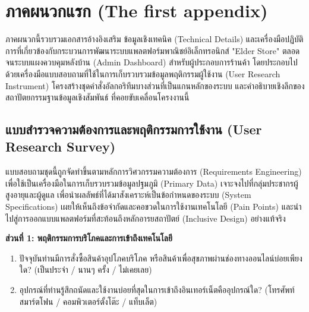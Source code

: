 \chapter{ภาคผนวกแรก (The first appendix)}

ภาคผนวกนี้รวบรวมเอกสารอ้างอิงเสริม ข้อมูลเชิงเทคนิค (Technical Details) และเครื่องมือปฏิบัติการที่เกี่ยวข้องกับกระบวนการพัฒนาระบบแพลตฟอร์มพาณิชย์อิเล็กทรอนิกส์ "Elder Store" ตลอดจนระบบแผงควบคุมหลังบ้าน (Admin Dashboard) สำหรับผู้ประกอบการร้านค้า โดยประกอบไปด้วยเครื่องมือแบบสอบถามที่ใช้ในการเก็บรวบรวมข้อมูลพฤติกรรมผู้ใช้งาน (User Research Instrument) โครงสร้างชุดคำสั่งอัลกอริทึมบางส่วนที่เป็นแกนหลักของระบบ และคำอธิบายเชิงลึกของสถาปัตยกรรมฐานข้อมูลเชิงสัมพันธ์ \cite{postgresql2023} ที่คอยขับเคลื่อนโครงงานนี้

\section{แบบสำรวจความต้องการและพฤติกรรมการใช้งาน (User Research Survey)}
แบบสอบถามชุดนี้ถูกจัดทำขึ้นตามหลักการวิศวกรรมความต้องการ (Requirements Engineering) \cite{pressman2014} เพื่อใช้เป็นเครื่องมือในการเก็บรวบรวมข้อมูลปฐมภูมิ (Primary Data) เจาะจงไปที่กลุ่มประชากรผู้สูงอายุและผู้ดูแล เพื่อนำผลลัพธ์ที่ได้มาสังเคราะห์เป็นข้อกำหนดของระบบ (System Specifications) เผยให้เห็นถึงข้อจำกัดและคอขวดในการใช้งานเทคโนโลยี (Pain Points) \cite{wai_older_users} และนำไปสู่การออกแบบแพลตฟอร์มที่สะท้อนถึงหลักอารยสถาปัตย์ (Inclusive Design) \cite{inclusive2022} อย่างแท้จริง

\textbf{ส่วนที่ 1: พฤติกรรมการบริโภคและการเข้าถึงเทคโนโลยี}
\begin{enumerate}
  \item ปัจจุบันท่านมีการสั่งซื้อสินค้าอุปโภคบริโภค หรือสินค้าเพื่อสุขภาพผ่านช่องทางออนไลน์บ่อยเพียงใด? (เป็นประจำ / นานๆ ครั้ง / ไม่เคยเลย)
  \item อุปกรณ์ที่ท่านรู้สึกถนัดและใช้งานบ่อยที่สุดในการเข้าถึงอินเทอร์เน็ตคืออุปกรณ์ใด? (โทรศัพท์สมาร์ตโฟน / คอมพิวเตอร์ตั้งโต๊ะ / แท็บเล็ต) 
\end{enumerate}

